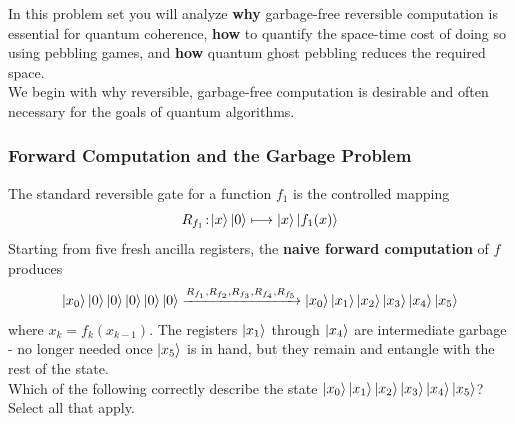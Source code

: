 In this problem set you will analyze \textbf{why} garbage-free reversible computation is essential for quantum coherence, \textbf{how} to quantify the space-time cost of doing so using pebbling games, and \textbf{how} quantum ghost pebbling reduces the required space. \\

We begin with why reversible, garbage-free computation is desirable and often necessary for the goals of quantum algorithms.

\subsubsection{Forward Computation and the Garbage Problem}
The standard reversible gate for a function $f_1$ is the controlled mapping
\begin{equation}
    R_{f_1} \! : \! \ket{x}\ket{0} \longmapsto \ket{x}\ket{f_1(x)}
\end{equation}
Starting from five fresh ancilla registers, the \textbf{naive forward computation} of $f$ produces
\begin{equation}
    \ket{x_0}\ket{0}\ket{0}\ket{0}\ket{0}\ket{0} \xrightarrow[]{R_{f_1}, R_{f_2}, R_{f_3}, R_{f_4}, R_{f_5}}\ket{x_0}\ket{x_1}\ket{x_2}\ket{x_3}\ket{x_4}\ket{x_5}
\end{equation}
where $x_k = f_k(x_{k-1})$. The registers $\ket{x_1}$ through $\ket{x_4}$  are intermediate garbage - no longer needed once $\ket{x_5}$ is in hand, but they remain and entangle with the rest of the state. \\

Which of the following correctly describe the state $\ket{x_0}\ket{x_1}\ket{x_2}\ket{x_3}\ket{x_4}\ket{x_5}$? Select all that apply. \\
\noindent{} 


